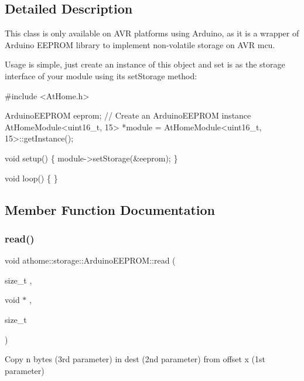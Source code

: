 \subsection{Detailed Description}
This class is only available on A\+VR platforms using Arduino, as it is a wrapper of Arduino E\+E\+P\+R\+OM library to implement non-\/volatile storage on A\+VR mcu.

Usage is simple, just create an instance of this object and set is as the storage interface of your module using its set\+Storage method\+:


\begin{DoxyCode}
\textcolor{preprocessor}{#include <AtHome.h>}

ArduinoEEPROM eeprom; \textcolor{comment}{// Create an ArduinoEEPROM instance}
AtHomeModule<uint16\_t, 15> *module = AtHomeModule<uint16\_t,
15>::getInstance();

\textcolor{keywordtype}{void} setup() \{
  module->setStorage(&eeprom);
\}

\textcolor{keywordtype}{void} loop() \{
\}
\end{DoxyCode}
 

\subsection{Member Function Documentation}
\mbox{\label{classathome_1_1storage_1_1_arduino_e_e_p_r_o_m_a853674189981dd3395ea76911d2eb1a0}} 
\subsubsection{\texorpdfstring{read()}{read()}}
{\footnotesize\ttfamily void athome\+::storage\+::\+Arduino\+E\+E\+P\+R\+O\+M\+::read (\begin{DoxyParamCaption}\item[{size\+\_\+t}]{,  }\item[{void $\ast$}]{,  }\item[{size\+\_\+t}]{ }\end{DoxyParamCaption})\hspace{0.3cm}{\ttfamily [virtual]}}

Copy n bytes (3rd parameter) in dest (2nd parameter) from offset x (1st parameter)

